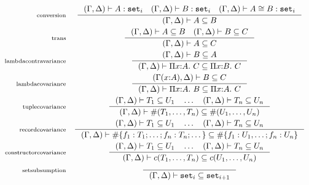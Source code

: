 \documentclass{article}
\newcommand{\fn}[1]{\mathtt{#1}}
\newcommand{\set}[1]{\fn{set}_{#1}}
\newcommand{\Piexpr}[3]{\Pi {#1}{:}{#2}.\ {#3}}
\newcommand{\rlbl}[1]{\mathrm{\scriptstyle{}#1}}
\newcommand{\ctxcons}[3]{#1 (#2{:}#3)}
\newcommand{\ctx}[2]{(#1,#2)}
\newcommand{\subtype}[2]{#1 \subseteq #2}
\begin{document}
\begin{gather*}
\begin{array}{rc}
\rlbl{conversion}&\displaystyle
\inference{\defctx{} |- A : \set{i}
     \quad \defctx{} |- B : \set{i}
     \quad \defctx{} |- A \cong B : \set{i}}
          {\defctx{} |- \subtype{A}{B}}\\[1em]
\rlbl{trans}&\displaystyle
\inference{\defctx{} |- \subtype{A}{B}
     \quad \defctx{} |- \subtype{B}{C}}
          {\defctx{} |- \subtype{A}{C}}\\[1em]
\rlbl{lambda contravariance}&\displaystyle
\inference{\defctx{} |- \subtype{B}{A}}
          {\defctx{} |- \subtype{\Piexpr{x}{A}{C}}{\Piexpr{x}{B}{C}}}\\[1em]
\rlbl{lambda covariance}&\displaystyle
\inference{\ctx{\ctxcons{\Gamma}{x}{A}}{\Delta} |- \subtype{B}{C}}
          {\defctx{} |- \subtype{\Piexpr{x}{A}{B}}{\Piexpr{x}{A}{C}}}\\[1em]
\rlbl{tuple covariance}&\displaystyle
\inference{\defctx{} |- \subtype{T_1}{U_1}
     \quad \dots
     \quad \defctx{} |- \subtype{T_n}{U_n}}
          {\defctx{} |- \subtype{\#(T_1, \dots, T_n)}{\#(U_1, \dots, U_n)}}\\[1em]
\rlbl{record covariance}&\displaystyle
\inference{\defctx{} |- \subtype{T_1}{U_1}
     \quad \dots
     \quad \defctx{} |- \subtype{T_n}{U_n}}
          {\defctx{} |- \subtype{\#\{f_1 : T_1; \dots; f_n : T_n; \dots\}}
                                {\#\{f_1 : U_1, \dots; f_n : U_n\}}}\\[1em]
\rlbl{constructor covariance}&\displaystyle
\inference{\defctx{} |- \subtype{T_1}{U_1}
     \quad \dots
     \quad \defctx{} |- \subtype{T_n}{U_n}}
          {\defctx{} |- \subtype{c(T_1, \dots, T_n)}{c(U_1, \dots, U_n)}}\\[1em]
\rlbl{set subsumption}&\displaystyle
\inference{}
          {\defctx{} |- \subtype{\set{i}}{\set{i+1}}}\\[1em]
\end{array}
\end{gather*}
\end{document}

